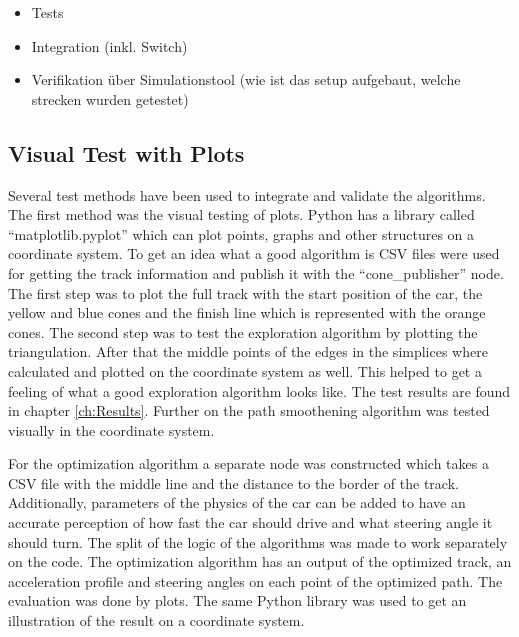 \begin{itemize}
    \item Tests
    \item Integration (inkl. Switch)
    \item Verifikation über Simulationstool (wie ist das setup aufgebaut, welche strecken wurden getestet)
\end{itemize}

\subsection{Visual Test with Plots} \label{sec:Visual Test with Plots}
Several test methods have been used to integrate and validate the algorithms. The first method was the visual testing of plots. Python has a library called ``matplotlib.pyplot'' which can plot points, graphs and other structures on a coordinate system. To get an idea what a good algorithm is CSV files were used for getting the track information and publish it with the ``cone\_publisher'' node. The first step was to plot the full track with the start position of the car, the yellow and blue cones and the finish line which is represented with the orange cones. The second step was to test the exploration algorithm by plotting the triangulation. After that the middle points of the edges in the simplices where calculated and plotted on the coordinate system as well. This helped to get a feeling of what a good exploration algorithm looks like. The test results are found in chapter \ref{ch:Results}. Further on the path smoothening algorithm was tested visually in the coordinate system.

For the optimization algorithm a separate node was constructed which takes a CSV file with the middle line and the distance to the border of the track. Additionally, parameters of the physics of the car can be added to have an accurate perception of how fast the car should drive and what steering angle it should turn. The split of the logic of the algorithms was made to work separately on the code. The optimization algorithm has an output of the optimized track, an acceleration profile and steering angles on each point of the optimized path. The evaluation was done by plots. The same Python library was used to get an illustration of the result on a coordinate system.

